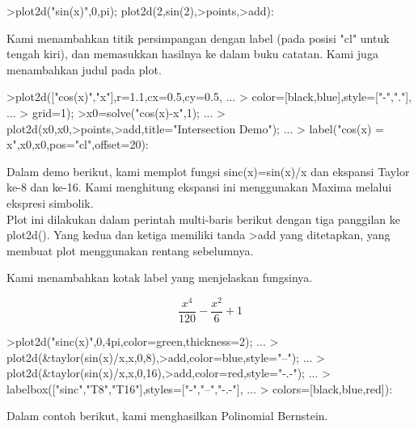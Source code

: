 \documentclass[a4paper,10pt]{article}
\begin{document}
\begin{eulernotebook}
\begin{eulercomment}
\begin{eulercomment}
\begin{eulercomment}
\begin{eulercomment}
\begin{eulercomment}
\begin{eulercomment}
\begin{eulercomment}
\begin{eulercomment}
\begin{eulercomment}
\begin{eulercomment}
\begin{eulercomment}
\end{eulercomment}
\begin{eulerprompt}
>plot2d("sin(x)",0,pi); plot2d(2,sin(2),>points,>add):
\end{eulerprompt}
\begin{eulercomment}
Kami menambahkan titik persimpangan dengan label (pada posisi "cl"
untuk tengah kiri), dan memasukkan hasilnya ke dalam buku catatan.
Kami juga menambahkan judul pada plot.
\end{eulercomment}
\begin{eulerprompt}
>plot2d(["cos(x)","x"],r=1.1,cx=0.5,cy=0.5, ...
>  color=[black,blue],style=["-","."], ...
>  grid=1);
>x0=solve("cos(x)-x",1);  ...
>  plot2d(x0,x0,>points,>add,title="Intersection Demo");  ...
>  label("cos(x) = x",x0,x0,pos="cl",offset=20):
\end{eulerprompt}
\begin{eulercomment}
Dalam demo berikut, kami memplot fungsi sinc(x)=sin(x)/x dan ekspansi
Taylor ke-8 dan ke-16. Kami menghitung ekspansi ini  menggunakan
Maxima melalui ekspresi simbolik.\\
Plot ini dilakukan dalam perintah multi-baris berikut dengan tiga
panggilan ke plot2d(). Yang kedua dan ketiga memiliki tanda \textgreater{}add yang
ditetapkan, yang membuat plot menggunakan rentang sebelumnya.

Kami menambahkan kotak label yang menjelaskan fungsinya.
\end{eulercomment}
\begin{eulerformula}
\[
\frac{x^4}{120}-\frac{x^2}{6}+1
\]
\end{eulerformula}
\begin{eulerprompt}
>plot2d("sinc(x)",0,4pi,color=green,thickness=2); ...
>  plot2d(&taylor(sin(x)/x,x,0,8),>add,color=blue,style="--"); ...
>  plot2d(&taylor(sin(x)/x,x,0,16),>add,color=red,style="-.-"); ...
>  labelbox(["sinc","T8","T16"],styles=["-","--","-.-"], ...
>    colors=[black,blue,red]):
\end{eulerprompt}
\begin{eulercomment}
Dalam contoh berikut, kami menghasilkan Polinomial Bernstein.


\end{eulercomment}
\end{eulercomment}
\end{eulercomment}
\end{eulercomment}
\end{eulercomment}
\end{eulercomment}
\end{eulercomment}
\end{eulercomment}
\end{eulercomment}
\end{eulercomment}
\end{eulercomment}
\end{eulernotebook}
\end{document}
